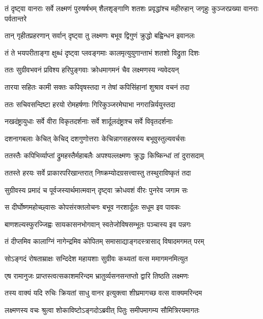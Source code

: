 \threelineshloka
{तं दृष्ट्वा वानराः सर्वे लक्ष्मणं पुरुषर्षभम्}
{शैलशृङ्गाणि शतशः प्रवृद्धांश्च महीरुहान्}
{जगृहुः कुञ्जरप्रख्या वानराः पर्वतान्तरे} %

\twolineshloka
{तान् गृहीतप्रहरणान् सर्वान् दृष्ट्वा तु लक्ष्मणः}
{बभूव द्विगुणं क्रुद्धो बह्विन्धन इवानलः} %

\twolineshloka
{तं ते भयपरीताङ्गा क्षुब्धं दृष्ट्वा प्लवङ्गमाः}
{कालमृत्युयुगान्ताभं शतशो विद्रुता दिशः} %

\twolineshloka
{ततः सुग्रीवभवनं प्रविश्य हरिपुङ्गवाः}
{क्रोधमागमनं चैव लक्ष्मणस्य न्यवेदयन्} %

\twolineshloka
{तारया सहितः कामी सक्तः कपिवृषस्तदा}
{न तेषां कपिसिंहानां शुश्राव वचनं तदा} %

\twolineshloka
{ततः सचिवसन्दिष्टा हरयो रोमहर्षणाः}
{गिरिकुञ्जरमेघाभा नगरान्निर्ययुस्तदा} %

\twolineshloka
{नखदंष्ट्रायुधाः सर्वे वीरा विकृतदर्शनाः}
{सर्वे शार्दूलदंष्ट्राश्च सर्वे विवृतदर्शनाः} %

\twolineshloka
{दशनागबलाः केचित् केचिद् दशगुणोत्तराः}
{केचिन्नागसहस्रस्य बभूवुस्तुल्यवर्चसः} %

\twolineshloka
{ततस्तैः कपिभिर्व्याप्तां द्रुमहस्तैर्महाबलैः}
{अपश्यल्लक्ष्मणः क्रुद्धः किष्किन्धां तां दुरासदाम्} %

\twolineshloka
{ततस्ते हरयः सर्वे प्राकारपरिखान्तरात्}
{निष्क्रम्योदग्रसत्त्वास्तु तस्थुराविष्कृतं तदा} %

\twolineshloka
{सुग्रीवस्य प्रमादं च पूर्वजस्यार्थमात्मवान्}
{दृष्ट्वा क्रोधवशं वीरः पुनरेव जगाम सः} %

\twolineshloka
{स दीर्घोष्णमहोच्छ्वासः कोपसंरक्तलोचनः}
{बभूव नरशार्दूलः सधूम इव पावकः} %

\twolineshloka
{बाणशल्यस्फुरज्जिह्वः सायकासनभोगवान्}
{स्वतेजोविषसम्भूतः पञ्चास्य इव पन्नगः} %

\twolineshloka
{तं दीप्तमिव कालाग्निं नागेन्द्रमिव कोपितम्}
{समासाद्याङ्गदस्त्रासाद् विषादमगमत् परम्} %

\twolineshloka
{सोऽङ्गदं रोषताम्राक्षः सन्दिदेश महायशाः}
{सुग्रीवः कथ्यतां वत्स ममागमनमित्युत} %

\twolineshloka
{एष रामानुजः प्राप्तस्त्वत्सकाशमरिन्दम}
{भ्रातुर्व्यसनसन्तप्तो द्वारि तिष्ठति लक्ष्मणः} %

\twolineshloka
{तस्य वाक्यं यदि रुचिः क्रियतां साधु वानर}
{इत्युक्त्वा शीघ्रमागच्छ वत्स वाक्यमरिन्दम} %

\twolineshloka
{लक्ष्मणस्य वचः श्रुत्वा शोकाविष्टोऽङ्गदोऽब्रवीत्}
{पितुः समीपमागम्य सौमित्रिरयमागतः} %

